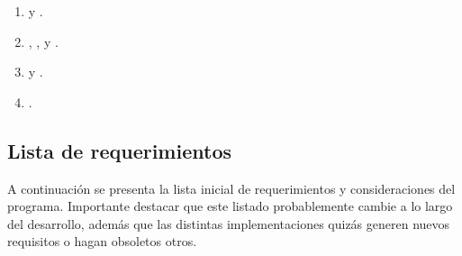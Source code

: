 \begin{enumerate}
\item {} y .

\item {}, ,  y .

\item {} y .

\item {}.
\end{enumerate}

\subsection{Lista de requerimientos}\label{intro:lista-de-requerimientos}
A continuación se presenta la lista inicial de requerimientos y consideraciones del programa. Importante destacar que este listado probablemente cambie a lo largo del desarrollo, además que las distintas implementaciones quizás generen nuevos requisitos o hagan obsoletos otros.

